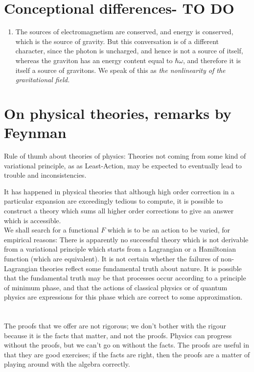 	\section{Conceptional differences- TO DO}
	\begin{enumerate}
		\item The sources of electromagnetism are conserved, and energy is conserved, which is the source of gravity. But this conversation is of a different character, since the photon is uncharged, and hence is not a source of itself, whereas the graviton has an energy content equal to $\hbar \omega$, and therefore it is itself a source of gravitons. We speak of this as \emph{the nonlinearity of the gravitational field.}
		
	\end{enumerate}
\section{On physical theories, remarks by Feynman}
\begin{statements}
	Rule of thumb about theories of physics: Theories not coming from some kind of variational principle, as as Least-Action, may be expected to eventually lead to trouble and inconsistencies.
\end{statements}
 It has happened in physical theories that although high order correction in a particular expansion are exceedingly tedious to compute, it is possible to construct a theory which sums all higher order corrections to give an answer which is accessible. \\
We shall search for a functional $F$ which is to be an action to be varied, for empirical reasons: There is apparently no successful theory which is not derivable from a variational principle which starts from a Lagrangian or a Hamiltonian function (which are equivalent). It is not certain whether the failures of non-Lagrangian theories reflect some fundamental truth about nature. It is possible that the fundamental truth may be that processes occur according to a principle of minimum phase, and that the actions of classical physics or of quantum physics are expressions for this phase which are correct to some approximation.\\
\\
\\
The proofs that we offer are not rigorous; we don't bother with the rigour because it is the facts that matter, and not the proofs. Physics can progress without the proofs, but we can't go on without the facts. The proofs are useful in that they are good exercises; if the facts are right, then the proofs are a matter of playing around with the algebra correctly.
